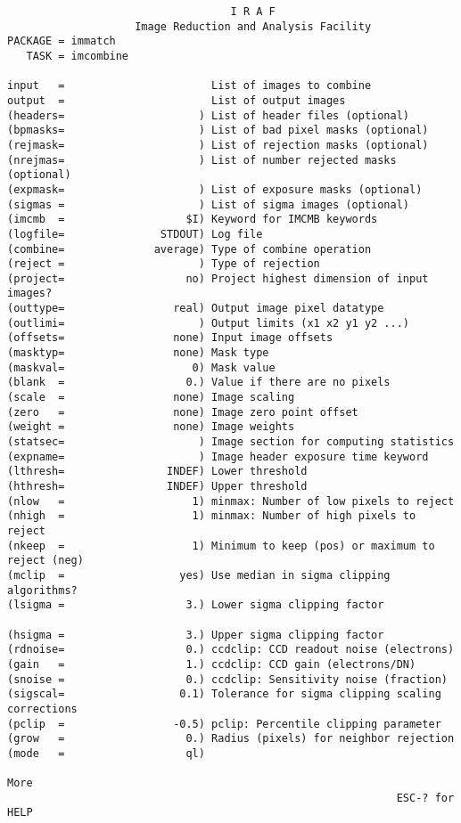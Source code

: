 \begin{screen}
\tiny{
\begin{verbatim}
                                   I R A F  
                    Image Reduction and Analysis Facility
PACKAGE = immatch
   TASK = imcombine
    
input   =                       List of images to combine
output  =                       List of output images
(headers=                     ) List of header files (optional)
(bpmasks=                     ) List of bad pixel masks (optional)
(rejmask=                     ) List of rejection masks (optional)
(nrejmas=                     ) List of number rejected masks (optional)
(expmask=                     ) List of exposure masks (optional)
(sigmas =                     ) List of sigma images (optional)
(imcmb  =                   $I) Keyword for IMCMB keywords
(logfile=               STDOUT) Log file
(combine=              average) Type of combine operation
(reject =                     ) Type of rejection
(project=                   no) Project highest dimension of input images?
(outtype=                 real) Output image pixel datatype
(outlimi=                     ) Output limits (x1 x2 y1 y2 ...)
(offsets=                 none) Input image offsets
(masktyp=                 none) Mask type
(maskval=                    0) Mask value
(blank  =                   0.) Value if there are no pixels
(scale  =                 none) Image scaling
(zero   =                 none) Image zero point offset
(weight =                 none) Image weights
(statsec=                     ) Image section for computing statistics
(expname=                     ) Image header exposure time keyword
(lthresh=                INDEF) Lower threshold
(hthresh=                INDEF) Upper threshold
(nlow   =                    1) minmax: Number of low pixels to reject
(nhigh  =                    1) minmax: Number of high pixels to reject
(nkeep  =                    1) Minimum to keep (pos) or maximum to reject (neg)
(mclip  =                  yes) Use median in sigma clipping algorithms?
(lsigma =                   3.) Lower sigma clipping factor

(hsigma =                   3.) Upper sigma clipping factor
(rdnoise=                   0.) ccdclip: CCD readout noise (electrons)
(gain   =                   1.) ccdclip: CCD gain (electrons/DN)
(snoise =                   0.) ccdclip: Sensitivity noise (fraction)
(sigscal=                  0.1) Tolerance for sigma clipping scaling corrections
(pclip  =                 -0.5) pclip: Percentile clipping parameter
(grow   =                   0.) Radius (pixels) for neighbor rejection
(mode   =                   ql)

More                                                                            
                                                             ESC-? for HELP
\end{verbatim}  
}
\end{screen}
